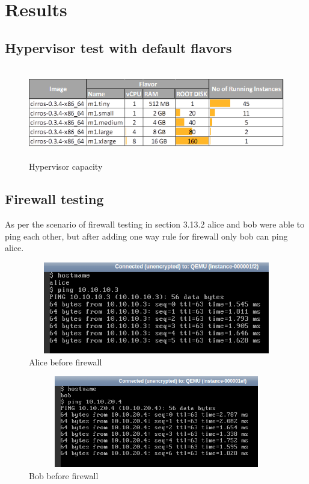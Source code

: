 \chapter{Results}
    \section{Hypervisor test with default flavors}
        \begin{figure}[h]
            \centering
            \includegraphics[width=14cm,height=4cm]{images/default_flavor2.png}
            \caption{Hypervisor capacity}
        \end{figure}
    
    \section{Firewall testing}
    \par As per the scenario of firewall testing in section 3.13.2 alice and bob were able to ping each other, but after adding one way rule for firewall only bob can ping alice.
    \begin{figure}[h]
            \centering
            \includegraphics[width=14cm,height=4cm]{images/alice_ping.png}
            \caption{Alice before firewall}
    \end{figure}
    \begin{figure}[h]
            \centering
            \includegraphics[width=14cm,height=4cm]{images/bob_ping.png}
            \caption{Bob before firewall}
    \end{figure}    
    
